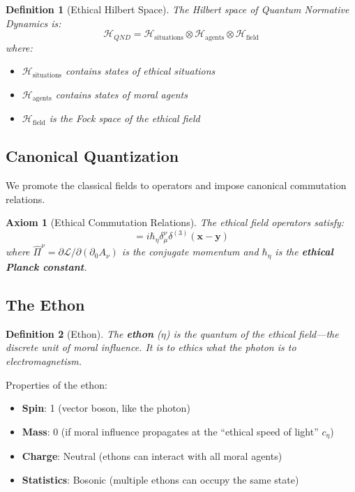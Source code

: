\documentclass[12pt]{article}
\newtheorem{definition}{Definition}[section]
\newtheorem{axiom}{Axiom}
\begin{document}
\begin{definition}[Ethical Hilbert Space]
The Hilbert space of Quantum Normative Dynamics is:
\begin{equation}
    \mathcal{H}_{QND} = \mathcal{H}_{\text{situations}} \otimes \mathcal{H}_{\text{agents}} \otimes \mathcal{H}_{\text{field}}
\end{equation}
where:
\begin{itemize}
    \item $\mathcal{H}_{\text{situations}}$ contains states of ethical situations
    \item $\mathcal{H}_{\text{agents}}$ contains states of moral agents
    \item $\mathcal{H}_{\text{field}}$ is the Fock space of the ethical field
\end{itemize}
\end{definition}

\subsection{Canonical Quantization}

We promote the classical fields to operators and impose canonical commutation relations.

\begin{axiom}[Ethical Commutation Relations]
The ethical field operators satisfy:
\begin{equation}
    [\hat{A}_\mu(x), \hat{\Pi}^\nu(y)] = i\hbar_\eta \delta_\mu^\nu \delta^{(3)}(\mathbf{x} - \mathbf{y})
\end{equation}
where $\hat{\Pi}^\nu = \partial\mathcal{L}/\partial(\partial_0 A_\nu)$ is the conjugate momentum and $\hbar_\eta$ is the \textbf{ethical Planck constant}.
\end{axiom}

\subsection{The Ethon}

\begin{definition}[Ethon]
The \textbf{ethon} ($\eta$) is the quantum of the ethical field---the discrete unit of moral influence. It is to ethics what the photon is to electromagnetism.
\end{definition}

Properties of the ethon:

\begin{itemize}
    \item \textbf{Spin}: 1 (vector boson, like the photon)
    \item \textbf{Mass}: 0 (if moral influence propagates at the ``ethical speed of light'' $c_\eta$)
    \item \textbf{Charge}: Neutral (ethons can interact with all moral agents)
    \item \textbf{Statistics}: Bosonic (multiple ethons can occupy the same state)
\end{itemize}
\end{document}
